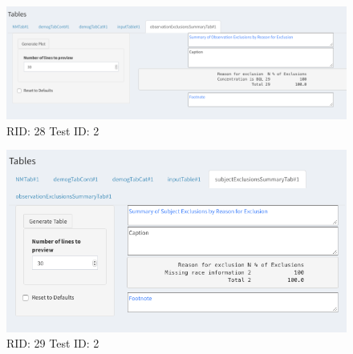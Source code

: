\documentclass{article}
\begin{document}
\begin{figure}[H]
\includegraphics[width=.8\textwidth]{screencaps/28-2-1.png}
\caption{RID: 28 Test ID: 2}
\end{figure}

\begin{figure}[H]
\includegraphics[width=.8\textwidth]{screencaps/29-2-1.png}
\caption{RID: 29 Test ID: 2}
\end{figure}










\end{document}
